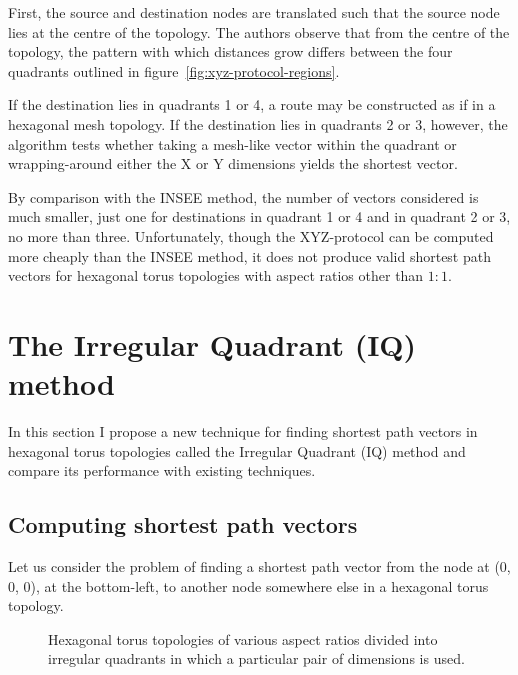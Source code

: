 				First, the source and destination nodes are translated such that the
				source node lies at the centre of the topology. The authors observe
				that from the centre of the topology, the pattern with which distances
				grow differs between the four quadrants outlined in
				figure~\ref{fig:xyz-protocol-regions}.
				
				If the destination lies in quadrants 1 or 4, a route may be constructed
				as if in a hexagonal mesh topology. If the destination lies in
				quadrants
				2 or 3, however, the algorithm tests whether taking a mesh-like vector
				within the quadrant or wrapping-around either the X or Y dimensions
				yields the shortest vector.
				
				By comparison with the INSEE method, the number of vectors considered
				is much smaller, just one for destinations in quadrant 1 or 4 and in
				quadrant 2 or 3, no more than three. Unfortunately, though the
				XYZ-protocol can be computed more cheaply than the INSEE method, it
				does not produce valid shortest path vectors for hexagonal torus
				topologies with aspect ratios other than $1:1$.
		
	\section{The Irregular Quadrant (IQ) method}
		
		In this section I propose a new technique for finding shortest path vectors
		in hexagonal torus topologies called the Irregular Quadrant (IQ) method and
		compare its performance with existing techniques.
		
		\subsection{Computing shortest path vectors}
		
			Let us consider the problem of finding a shortest path vector from the node
			at (0, 0, 0), at the bottom-left, to another node somewhere else in a
			hexagonal torus topology.
			
			\begin{figure}
				\center
				
				\caption[The four irregular quadrants defined by the IQ method.]%
				{Hexagonal torus topologies of various aspect ratios divided
				into irregular quadrants in which a particular pair of dimensions is used.}
				\label{fig:shortest-path-regions}
			\end{figure}
			
